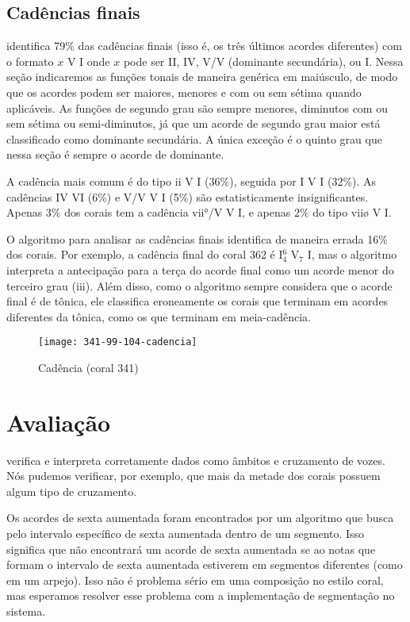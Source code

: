 \subsection{Cadências finais}
\label{sec:cadencias}

\rameau{} identifica 79\% das cadências finais (isso é, os três
últimos acordes diferentes) com o formato $x$ V I onde $x$ pode ser
II, IV, V/V (dominante secundária), ou I. Nessa seção indicaremos as
funções tonais de maneira genérica em maiúsculo, de modo que os
acordes podem ser maiores, menores e com ou sem sétima quando
aplicáveis. As funções de segundo grau são sempre menores, diminutos
com ou sem sétima ou semi-diminutos, já que um acorde de segundo grau
maior está classificado como dominante secundária. A única exceção é o
quinto grau que nessa seção é sempre o acorde de dominante.

A cadência mais comum é do tipo ii V I (36\%), seguida por I V I
(32\%). As cadências IV VI (6\%) e V/V V I (5\%) são estatisticamente
insignificantes. Apenas 3\% dos corais tem a cadência vii°/V V I, e
apenas 2\% do tipo viiø V I.

O algoritmo para analisar as cadências finais identifica de maneira
errada 16\% dos corais. Por exemplo, a cadência final do coral 362 é
I$^6_4$ V$_7$ I, mas o algoritmo interpreta a antecipação para a terça
do acorde final como um acorde menor do terceiro grau (iii). Além
disso, como o algoritmo sempre considera que o acorde final é de
tônica, ele classifica eroneamente os corais que terminam em acordes
diferentes da tônica, como os que terminam em meia-cadência.

\begin{figure}
  \centering
  \texttt{[image: 341-99-104-cadencia]}
  \caption{Cadência (coral 341)}
  \label{fig:cadencia}
\end{figure}

\section{Avaliação}
\label{sec:avaliacao}

\rameau{} verifica e interpreta corretamente dados como âmbitos e
cruzamento de vozes. Nós pudemos verificar, por exemplo, que mais da
metade dos corais possuem algum tipo de cruzamento.

Os acordes de sexta aumentada foram encontrados por um algoritmo que
busca pelo intervalo específico de sexta aumentada dentro de um
segmento. Isso significa que \rameau{} não encontrará um acorde de
sexta aumentada se ao notas que formam o intervalo de sexta aumentada
estiverem em segmentos diferentes (como em um arpejo). Isso não é
problema sério em uma composição no estilo coral, mas esperamos
resolver esse problema com a implementação de segmentação no sistema.

